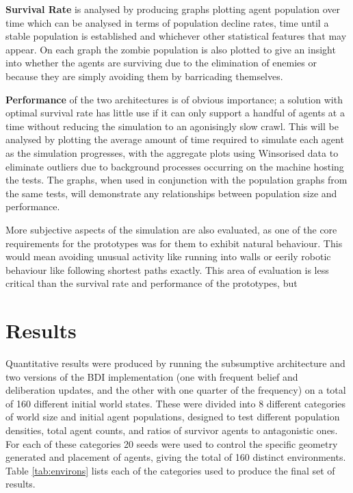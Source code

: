 \documentclass[a4paper,12pt]{article}
\begin{document}
\textbf{Survival Rate} is analysed by producing graphs plotting agent population over time which can be analysed in terms of population decline rates, time until a stable population is established and whichever other statistical features that may appear. On each graph the zombie population is also plotted to give an insight into whether the agents are surviving due to the elimination of enemies or because they are simply avoiding them by barricading themselves.

\textbf{Performance} of the two architectures is of obvious importance; a solution with optimal survival rate has little use if it can only support a handful of agents at a time without reducing the simulation to an agonisingly slow crawl. This will be analysed by plotting the average amount of time required to simulate each agent as the simulation progresses, with the aggregate plots using Winsorised data to eliminate outliers due to background processes occurring on the machine hosting the tests. The graphs, when used in conjunction with the population graphs from the same tests, will demonstrate any relationships between population size and performance.

More subjective aspects of the simulation are also evaluated, as one of the core requirements for the prototypes was for them to exhibit natural behaviour. This would mean avoiding unusual activity like running into walls or eerily robotic behaviour like following shortest paths exactly. This area of evaluation is less critical than the survival rate and performance of the prototypes, but 

\newpage
\section{Results}
\noindent
Quantitative results were produced by running the subsumptive architecture and two versions of the BDI implementation (one with frequent belief and deliberation updates, and the other with one quarter of the frequency) on a total of 160 different initial world states. These were divided into 8 different categories of world size and initial agent populations, designed to test different population densities, total agent counts, and ratios of survivor agents to antagonistic ones. For each of these categories 20 seeds were used to control the specific geometry generated and placement of agents, giving the total of 160 distinct environments. Table \ref{tab:environs} lists each of the categories used to produce the final set of results.
\end{document}
